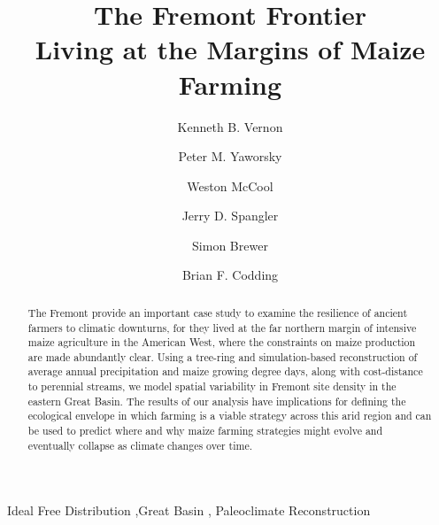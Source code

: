 \documentclass[
  number,
  preprint,
  3p]{elsarticle}
\begin{document}
\begin{frontmatter}
\title{The Fremont Frontier \\\large{Living at the Margins of Maize
Farming} }
\author[1]{Kenneth B. Vernon%
%
}
\author[2,3]{Peter M. Yaworsky%
%
}

\author[4]{Weston McCool%
%
}

\author[4]{Jerry D. Spangler%
%
}

\author[5,6]{Simon Brewer%
%
}

\author[4,6]{Brian F. Codding%
%
}









        
\begin{abstract}
The Fremont provide an important case study to examine the resilience of
ancient farmers to climatic downturns, for they lived at the far
northern margin of intensive maize agriculture in the American West,
where the constraints on maize production are made abundantly clear.
Using a tree-ring and simulation-based reconstruction of average annual
precipitation and maize growing degree days, along with cost-distance to
perennial streams, we model spatial variability in Fremont site density
in the eastern Great Basin. The results of our analysis have
implications for defining the ecological envelope in which farming is a
viable strategy across this arid region and can be used to predict where
and why maize farming strategies might evolve and eventually collapse as
climate changes over time.
\end{abstract}





\begin{keyword}
    Ideal Free Distribution \sep Great Basin \sep 
    Paleoclimate Reconstruction
\end{keyword}
\end{frontmatter}
\end{document}
